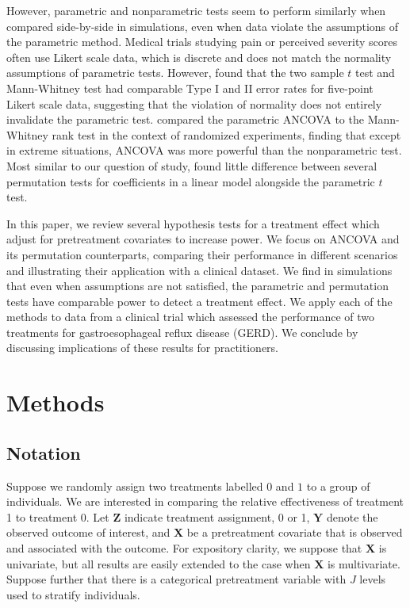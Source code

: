\documentclass[11pt]{article}
\begin{document}
However, parametric and nonparametric tests seem to perform similarly when compared side-by-side in simulations, even when data violate the assumptions of the parametric method.
Medical trials studying pain or perceived severity scores often use Likert scale data, which is discrete and does not match the normality assumptions of parametric tests.
However, \cite{winter_five-point_2010} found that the two sample $t$ test and Mann-Whitney test had comparable Type I and II error rates for five-point Likert scale data, suggesting that the violation of normality does not entirely invalidate the parametric test.
\cite{vickers_parametric_2005} compared the parametric ANCOVA to the Mann-Whitney rank test in the context of randomized experiments, finding that except in extreme situations, ANCOVA was more powerful than the nonparametric test.
Most similar to our question of study, \cite{anderson_empirical_1999} found little difference between several permutation tests for coefficients in a linear model alongside the parametric $t$ test.

In this paper, we review several hypothesis tests for a treatment effect which adjust for pretreatment covariates to increase power.  
We focus on ANCOVA and its permutation counterparts, comparing their performance in different scenarios and illustrating their application with a clinical dataset.
We find in simulations that even when assumptions are not satisfied, the parametric and permutation tests have comparable power to detect a treatment effect.
We apply each of the methods to data from a clinical trial which assessed the performance of two treatments for gastroesophageal reflux disease (GERD).
We conclude by discussing implications of these results for practitioners.

\section*{Methods}


\subsection*{Notation}
Suppose we randomly assign two treatments labelled $0$ and $1$ to a group of individuals.
We are interested in comparing the relative effectiveness of treatment 1 to treatment 0.
Let $\mathbf{Z}$ indicate treatment assignment, 0 or 1, 
$\mathbf{Y}$ denote the observed outcome of interest,
and $\mathbf{X}$ be a pretreatment covariate that is observed and associated with the outcome.
For expository clarity, we suppose that $\mathbf{X}$ is univariate, but all results are easily extended to the case when $\mathbf{X}$ is multivariate.
Suppose further that there is a categorical pretreatment variable with $J$ levels used to stratify individuals. 
\end{document}

